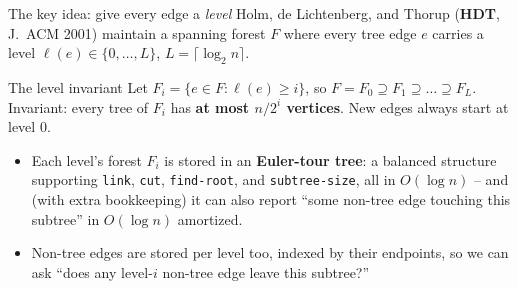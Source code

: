 \documentclass[11pt,aspectratio=169]{beamer}
\begin{document}
\begin{frame}{The key idea: give every edge a \emph{level}}
  Holm, de Lichtenberg, and Thorup (\textbf{HDT}, J.\ ACM 2001) maintain a spanning
  forest $F$ where every tree edge $e$ carries a level $\ell(e) \in \{0,\dots,L\}$,
  $L = \lceil \log_2 n \rceil$.
  \begin{block}{The level invariant}
    Let $F_i = \{e \in F : \ell(e) \ge i\}$, so $F = F_0 \supseteq F_1 \supseteq \dots
    \supseteq F_L$. Invariant: every tree of $F_i$ has \textbf{at most $n/2^i$
    vertices}. New edges always start at level $0$.
  \end{block}
  \begin{itemize}
    \item Each level's forest $F_i$ is stored in an \textbf{Euler-tour tree}: a
    balanced structure supporting \texttt{link}, \texttt{cut}, \texttt{find-root}, and
    \texttt{subtree-size}, all in $O(\log n)$ -- and (with extra bookkeeping) it can
    also report ``some non-tree edge touching this subtree'' in $O(\log n)$ amortized.
    \item Non-tree edges are stored per level too, indexed by their endpoints, so we can
    ask ``does any level-$i$ non-tree edge leave this subtree?''
  \end{itemize}
\end{frame}
\end{document}
